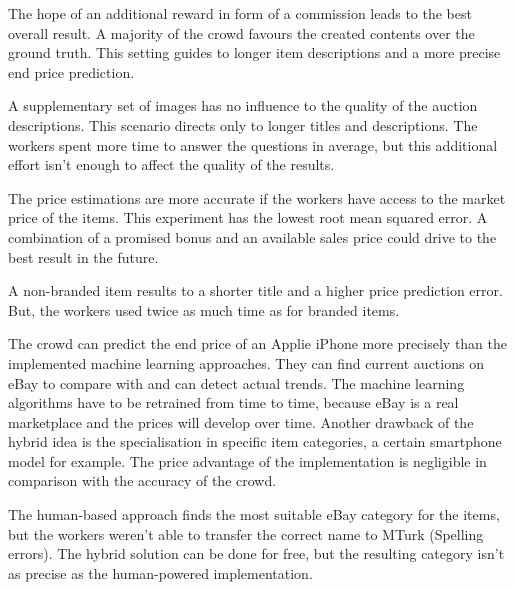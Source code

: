 The hope of an additional reward in form of a commission leads to the best overall result. A majority of the crowd favours the created contents over the ground truth. This setting guides to longer item descriptions and a more precise end price prediction.

A supplementary set of images has no influence to the quality of the auction descriptions. This scenario directs only to longer titles and descriptions. The workers spent more time to answer the questions in average, but this additional effort isn't enough to affect the quality of the results.

The price estimations are more accurate if the workers have access to the market price of the items. This experiment has the lowest root mean squared error. A combination of a promised bonus and an available sales price could drive to the best result in the future.

A non-branded item results to a shorter title and a higher price prediction error. But, the workers used twice as much time as for branded items.

The crowd can predict the end price of an Applie iPhone more precisely than the implemented machine learning approaches. They can find current auctions on eBay to compare with and can detect actual trends. The machine learning algorithms have to be retrained from time to time, because eBay is a real marketplace and the prices will develop over time. Another drawback of the hybrid idea is the specialisation in specific item categories, a certain smartphone model for example. The price advantage of the implementation is negligible in comparison with the accuracy of the crowd.

The human-based approach finds the most suitable eBay category for the items, but the workers weren't able to transfer the correct name to MTurk (Spelling errors). The hybrid solution can be done for free, but the resulting category isn't as precise as the human-powered implementation.
